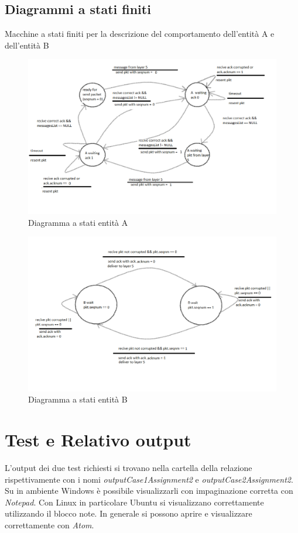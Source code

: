 \documentclass[a4paper]{article}
\begin{document}
\subsection{Diagrammi a stati finiti}
Macchine a stati finiti per la descrizione del comportamento dell'entità A e dell'entità B
\begin{figure}[h!]
\includegraphics[scale = 0.40]{A.png}
\caption{Diagramma a stati entità A}
\end{figure}
\newline
\begin{figure}[h!]
\includegraphics[scale = 0.30]{B.png}
\caption{Diagramma a stati entità B}
\end{figure}
 \newpage

\section{Test e Relativo output}
L'output dei due test richiesti si trovano nella cartella della relazione rispettivamente con i nomi \emph{outputCase1Assignment2} e \emph{outputCase2Assignment2}. Su in ambiente Windows è possibile visualizzarli con impaginazione corretta con \emph{Notepad}. Con Linux in particolare Ubuntu si visualizzano correttamente utilizzando il blocco note. In generale si possono aprire e visualizzare correttamente con \emph{Atom}.
\end{document}
